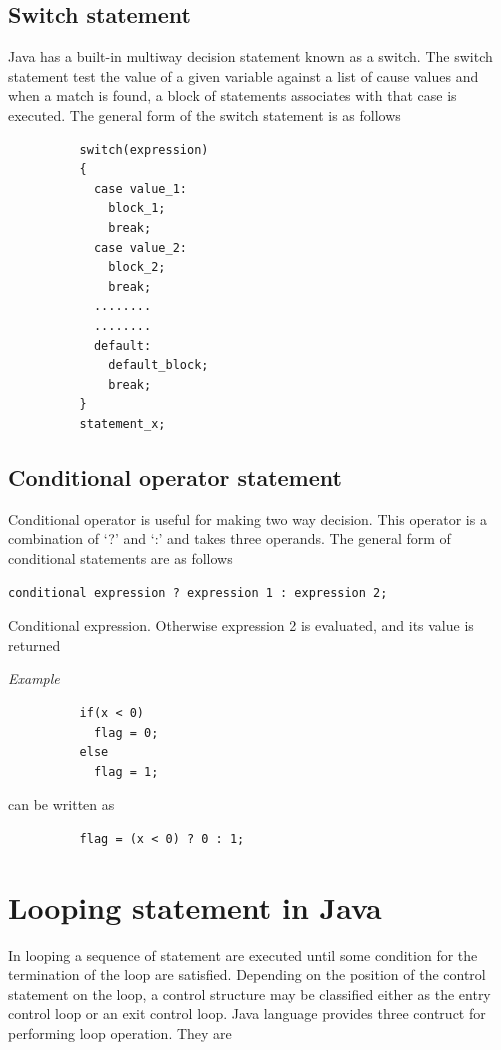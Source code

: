 \documentclass[11pt, a4paper]{book}
\begin{document}
        \subsection{Switch statement}
        Java has a built-in multiway decision statement known as a switch. The switch statement test the value of a given variable against a list of cause values and when a match is found, a block of statements associates with that case is executed. The general form of the switch statement is as follows
        \begin{lstlisting}
          switch(expression)
          {
            case value_1:
              block_1;
              break;
            case value_2:
              block_2;
              break;
            ........
            ........
            default:
              default_block;
              break;
          }
          statement_x;
        \end{lstlisting}
  
        \subsection{Conditional operator statement}
        Conditional operator is useful for making two way decision. This operator is a combination of `?' and `:' and takes three operands. The general form of conditional statements are as follows
  
        \texttt{conditional expression ? expression 1 : expression 2;}
  
        Conditional expression. Otherwise expression 2 is evaluated, and its value is returned
  
        \textit{Example}
        \begin{lstlisting}
          if(x < 0)
            flag = 0;
          else
            flag = 1;
        \end{lstlisting}
        can be written as 
        \begin{lstlisting}
          flag = (x < 0) ? 0 : 1;
        \end{lstlisting}
  
    \section{Looping statement in Java}
      In looping a sequence of statement are executed until some condition for the termination of the loop are satisfied. Depending on the position of the control statement on the loop, a control structure may be classified either as the entry control loop or an exit control loop. Java language provides
      three contruct for performing loop operation. They are
  
\end{document}
